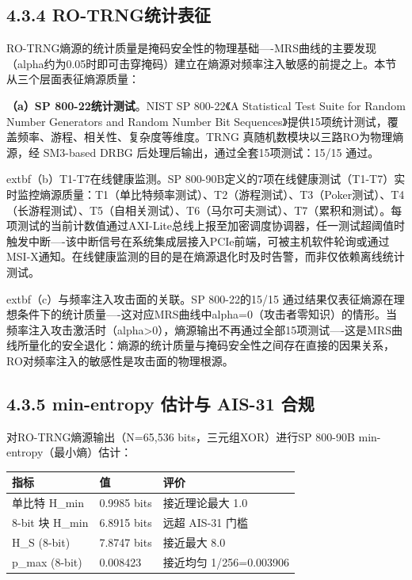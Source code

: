 \documentclass[journal]{IEEEtran}
\begin{document}
\subsection{4.3.4 RO-TRNG统计表征}

RO-TRNG熵源的统计质量是掩码安全性的物理基础----MRS曲线的主要发现（alpha约为0.05时即可击穿掩码）建立在熵源对频率注入敏感的前提之上。本节从三个层面表征熵源质量：

\textbf{（a）SP 800-22统计测试}。NIST SP 800-22《A Statistical Test Suite for Random Number Generators and Random Number Bit Sequences》提供15项统计测试，覆盖频率、游程、相关性、复杂度等维度。TRNG 真随机数模块以三路RO为物理熵源，经 SM3-based DRBG 后处理后输出，通过全套15项测试：15/15 通过。

	extbf{（b）T1-T7在线健康监测}。SP 800-90B定义的7项在线健康测试（T1-T7）实时监控熵源质量：T1（单比特频率测试）、T2（游程测试）、T3（Poker测试）、T4（长游程测试）、T5（自相关测试）、T6（马尔可夫测试）、T7（累积和测试）。每项测试的当前计数值通过AXI-Lite总线上报至加密调度协调器，任一测试超阈值时触发中断----该中断信号在系统集成层接入PCIe前端，可被主机软件轮询或通过MSI-X通知。在线健康监测的目的是在熵源退化时及时告警，而非仅依赖离线统计测试。

	extbf{（c）与频率注入攻击面的关联}。SP 800-22的15/15 通过结果仅表征熵源在理想条件下的统计质量----这对应MRS曲线中alpha=0（攻击者零知识）的情形。当频率注入攻击激活时（alpha>0），熵源输出不再通过全部15项测试----这是MRS曲线所量化的安全退化：熵源的统计质量与掩码安全性之间存在直接的因果关系，RO对频率注入的敏感性是攻击面的物理根源。

\subsection{4.3.5 min-entropy 估计与 AIS-31 合规}

对RO-TRNG熵源输出（N=65,536 bits，三元组XOR）进行SP 800-90B min-entropy（最小熵）估计：

\begin{table}[h]
\centering
\begin{tabular}{lll}
\hline
\textbf{指标} & \textbf{值} & \textbf{评价} \\
\hline
单比特 H\_min & 0.9985 bits & 接近理论最大 1.0 \\
8-bit 块 H\_min & 6.8915 bits & 远超 AIS-31 门槛 \\
H\_S (8-bit) & 7.8747 bits & 接近最大 8.0 \\
p\_max (8-bit) & 0.008423 & 接近均匀 1/256=0.003906 \\
\hline
\end{tabular}
\end{table}
\end{document}
